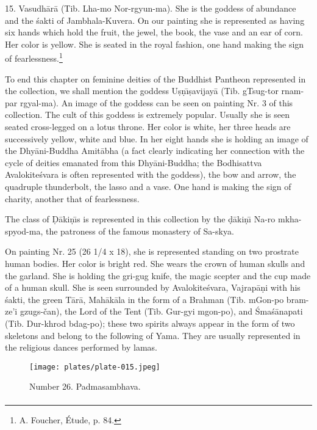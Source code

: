 \documentclass[a4paper, 12pt, oneside]{article}
\begin{document}
15. Vasudh\={a}r\={a} (Tib. Lha-mo Nor-rgyun-ma). She is the goddess of abundance and the \'{s}akti of Jambhala-Kuvera. On our painting she is represented as having six hands which hold the fruit, the jewel, the book, the vase and an ear of corn. Her color is yellow. She is seated in the royal fashion, one hand making the sign of fearlessness.\footnote{A. Foucher, Étude, p. 84.}

To end this chapter on feminine deities of the Buddhist Pantheon represented in the collection, we shall mention the goddess U\d{s}\d{n}\={\i}\d{s}avijay\={a} (Tib. gTsug-tor rnam-par rgyal-ma). An image of the goddess can be seen on painting Nr. 3 of this collection. The cult of this goddess is extremely popular. Usually she is seen seated cross-legged on a lotus throne. Her color is white, her three heads are successively yellow, white and blue. In her eight hands she is holding an image of the Dhy\={a}ni-Buddha Amit\={a}bha (a fact clearly indicating her connection with the cycle of deities emanated from this Dhy\={a}ni-Buddha; the Bodhisattva Avalokite\'{s}vara is often represented with the goddess), the bow and arrow, the quadruple thunderbolt, the lasso and a vase. One hand is making the sign of charity, another that of fearlessness.

The class of \d{D}\={a}ki\d{n}\={\i}s is represented in this collection by the \d{d}\={a}ki\d{n}\={\i} Na-ro mkha-spyod-ma, the patroness of the famous monastery of Sa-skya.

\bigskip

On painting Nr. 25 (26 1/4 x 18), she is represented standing on two prostrate human bodies. Her color is bright red. She wears the crown of human skulls and the garland. She is holding the gri-gug knife, the magic scepter and the cup made of a human skull. She is seen surrounded by Avalokite\'{s}vara, Vajrap\={a}\d{n}i with his \'{s}akti, the green T\={a}r\={a}, Mah\={a}k\={a}la in the form of a Brahman (Tib. mGon-po bram-ze'i gzugs-čan), the Lord of the Tent (Tib. Gur-gyi mgon-po), and \'{S}ma\'{s}\={a}napati (Tib. Dur-khrod bdag-po); these two spirits always appear in the form of two skeletons and belong to the following of Yama. They are usually represented in the religious dances performed by lamas.
\clearpage
\begin{figure}[H]
\centering
\texttt{[image: plates/plate-015.jpeg]}
\caption*{Number 26. Padmasambhava.}
\end{figure}
\clearpage
\paragraph{}
\end{document}
